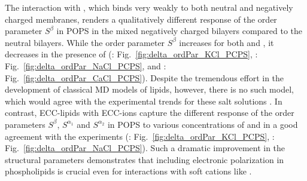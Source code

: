 \documentclass[journal=jpcbfk,manuscript=article]{achemso}
\begin{document}
% 
The interaction with , which binds very weakly to both neutral and negatively charged membranes, 
renders a qualitatively different response of the order parameter $S^\beta$ in POPS 
in the mixed negatively charged bilayers compared to the neutral bilayers. 
While the order parameter $S^\beta$ increases for both  and ,
it decreases in the presence of 
(:  Fig.~\ref{fig:delta_ordPar_KCl_PCPS}, 
 : Fig.~\ref{fig:delta_ordPar_NaCl_PCPS}, and
: Fig.~\ref{fig:delta_ordPar_CaCl_PCPS}). 
Despite the tremendous effort in the development of classical MD models of lipids, however,
there is no such model, 
which would agree with the experimental trends for these salt solutions \cite{nmrlipids_proj4}. 
In contrast, ECC-lipids with ECC-ions capture the different response 
of the order parameters $S^{\beta}$, $S^{\alpha _1}$ and $S^{\alpha _2}$ in POPS 
to various concentrations of  and  in a good agreement with the experiments
(:  Fig.~\ref{fig:delta_ordPar_KCl_PCPS}, 
 : Fig.~\ref{fig:delta_ordPar_NaCl_PCPS}). 
Such a dramatic improvement in the structural parameters 
demonstrates that including electronic polarization in phospholipids is crucial 
even for interactions with soft cations like . 
\end{document}

